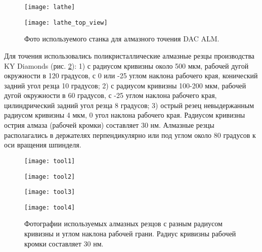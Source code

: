 \begin{figure}[ht]
  \begin{minipage}[ht]{0.49\linewidth}\centering
    \texttt{[image: lathe]}
  \end{minipage}
  \hfill
  \begin{minipage}[ht]{0.49\linewidth}\centering
    \texttt{[image: lathe\_top\_view]}
  \end{minipage}
  \caption{Фото используемого станка для алмазного точения DAC ALM.}
  \label{lathe}
\end{figure}

Для точения использовались поликристаллические алмазные резцы производства KY Diamonds (рис. \ref{diamond_tools}): 1) с радиусом кривизны около 500 мкм, рабочей дугой окружности в 120 градусов, с 0 или -25 углом наклона рабочего края, конический задний угол резца 10 градусов; 2) с радиусом кривизны 100-200 мкм, рабочей дугой окружности в 60 градусов, с -25 углом наклона рабочего края, цилиндрический задний угол резца 8 градусов; 3) острый резец невыдержанным радиусом кривизны 4 мкм, 0 угол наклона рабочего края. Радиусом кривизны острия алмаза (рабочей кромки) составляет 30 нм. Алмазные резцы располагались в держателях перпендикулярно или под углом около 80 градусов к оси вращения шпинделя.

\begin{figure}[ht]
  \begin{minipage}[ht]{0.24\linewidth}\centering
    \texttt{[image: tool1]}
  \end{minipage}
  \hfill
  \begin{minipage}[ht]{0.24\linewidth}\centering
    \texttt{[image: tool2]}
  \end{minipage}
  \hfill
  \begin{minipage}[ht]{0.24\linewidth}\centering
    \texttt{[image: tool3]}
  \end{minipage}
  \hfill
  \begin{minipage}[ht]{0.24\linewidth}\centering
    \texttt{[image: tool4]}
  \end{minipage}
  \caption{Фотографии используемых алмазных резцов с разным радиусом кривизны и углом наклона рабочей грани. Радиус кривизны рабочей кромки составляет 30 нм.}
  \label{diamond_tools}
\end{figure}

